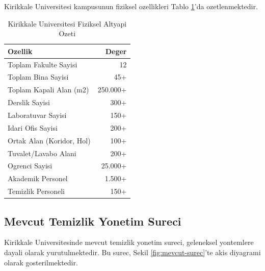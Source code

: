 Kirikkale Universitesi kampusunun fiziksel ozellikleri Tablo 
\ref{tab:fiziksel-altyapi}'da ozetlenmektedir.

\begin{table}[H]
\centering
\caption{Kirikkale Universitesi Fiziksel Altyapi Ozeti}
\label{tab:fiziksel-altyapi}
\begin{tabular}{|l|r|}
\hline
\textbf{Ozellik} & \textbf{Deger} \\
\hline
Toplam Fakulte Sayisi & 12 \\
\hline
Toplam Bina Sayisi & 45+ \\
\hline
Toplam Kapali Alan (m2) & 250.000+ \\
\hline
Derslik Sayisi & 300+ \\
\hline
Laboratuvar Sayisi & 150+ \\
\hline
Idari Ofis Sayisi & 200+ \\
\hline
Ortak Alan (Koridor, Hol) & 100+ \\
\hline
Tuvalet/Lavabo Alani & 200+ \\
\hline
Ogrenci Sayisi & 25.000+ \\
\hline
Akademik Personel & 1.500+ \\
\hline
Temizlik Personeli & 150+ \\
\hline
\end{tabular}
\end{table}

\subsection{Mevcut Temizlik Yonetim Sureci}
\label{subsec:mevcut-surec}

Kirikkale Universitesinde mevcut temizlik yonetim sureci, 
geleneksel yontemlere dayali olarak yurutulmektedir. Bu surec, 
Sekil \ref{fig:mevcut-surec}'te akis diyagrami olarak 
gosterilmektedir.

